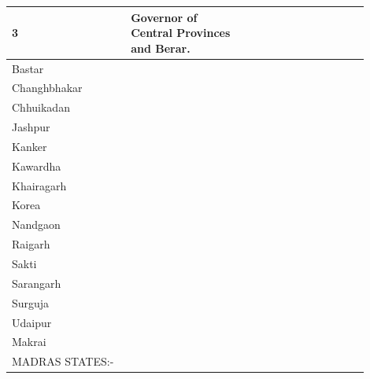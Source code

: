 \begin{longtable}{|p{0.30\linewidth}|p{0.30\linewidth}|p{0.30\linewidth}|}
{3









} & \multirow{16}{*}{





















Governor of Central Provinces and Berar.









} \\
\hline
Bastar

 \\
\hline
Changhbhakar

 \\
\hline
Chhuikadan

 \\
\hline
Jashpur

 \\
\hline
Kanker

 \\
\hline
Kawardha

 \\
\hline
Khairagarh

 \\
\hline
Korea

 \\
\hline
Nandgaon

 \\
\hline
Raigarh

 \\
\hline
Sakti

 \\
\hline
Sarangarh

 \\
\hline
Surguja

 \\
\hline
Udaipur

 \\
\hline
Makrai

 \\
\hline
MADRAS STATES:-

 & \multirow{3}{*}{



}
\end{longtable}

